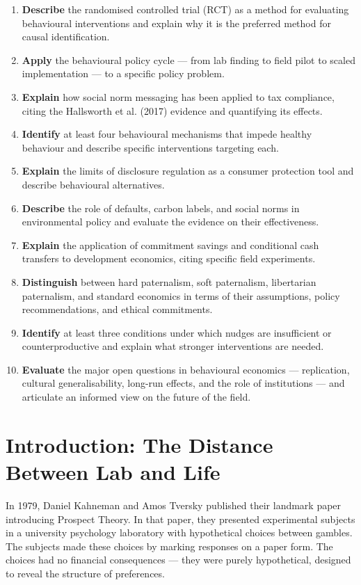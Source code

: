 \documentclass[12pt, letterpaper]{article}
\begin{document}
\begin{enumerate}
\item \textbf{Describe} the randomised controlled trial (RCT) as a method for evaluating behavioural interventions and explain why it is the preferred method for causal identification.
\item \textbf{Apply} the behavioural policy cycle --- from lab finding to field pilot to scaled implementation --- to a specific policy problem.
\item \textbf{Explain} how social norm messaging has been applied to tax compliance, citing the Hallsworth et al. (2017) evidence and quantifying its effects.
\item \textbf{Identify} at least four behavioural mechanisms that impede healthy behaviour and describe specific interventions targeting each.
\item \textbf{Explain} the limits of disclosure regulation as a consumer protection tool and describe behavioural alternatives.
\item \textbf{Describe} the role of defaults, carbon labels, and social norms in environmental policy and evaluate the evidence on their effectiveness.
\item \textbf{Explain} the application of commitment savings and conditional cash transfers to development economics, citing specific field experiments.
\item \textbf{Distinguish} between hard paternalism, soft paternalism, libertarian paternalism, and standard economics in terms of their assumptions, policy recommendations, and ethical commitments.
\item \textbf{Identify} at least three conditions under which nudges are insufficient or counterproductive and explain what stronger interventions are needed.
\item \textbf{Evaluate} the major open questions in behavioural economics --- replication, cultural generalisability, long-run effects, and the role of institutions --- and articulate an informed view on the future of the field.
\end{enumerate}

\medskip


\section*{Introduction: The Distance Between Lab and Life}


In 1979, Daniel Kahneman and Amos Tversky published their landmark paper introducing Prospect Theory. In that paper, they presented experimental subjects in a university psychology laboratory with hypothetical choices between gambles. The subjects made these choices by marking responses on a paper form. The choices had no financial consequences --- they were purely hypothetical, designed to reveal the structure of preferences.
\end{document}
